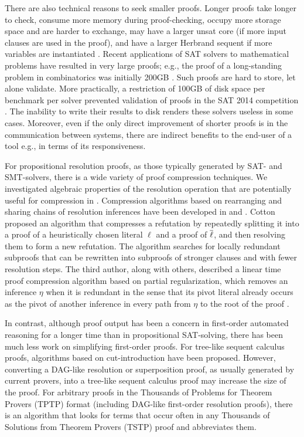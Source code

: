 There are also technical reasons to seek smaller proofs.
Longer proofs take longer to check, consume more memory during proof-checking, occupy more storage space and are harder to exchange, may have a larger unsat core (if more input clauses are used in the proof), and have a larger Herbrand sequent if more variables are instantiated \cite{B10,B16,ResolutionHerbrand,Reis}. Recent applications of SAT solvers to mathematical problems have resulted in very large proofs; e.g., the proof of a long-standing problem in combinatorics was initially 200GB \cite{heule2016solving}. Such proofs are hard to store, let alone validate. More practically, a restriction of 100GB of disk space per benchmark per solver prevented validation of proofs in the SAT 2014 competition \cite{clausal}. 
The inability to write their results to disk renders these solvers useless in some cases. Moreover, even if the only direct improvement of shorter proofs is in the communication between systems, there are indirect benefits to the end-user of a tool e.g., in terms of its responsiveness. 


For propositional resolution proofs, as those typically generated by SAT- and SMT-solvers, there is a wide variety of proof compression techniques. We investigated algebraic properties of the resolution operation that are potentially useful for compression in \cite{bwp10}.
Compression algorithms based on rearranging and sharing chains of resolution inferences have been
developed in \cite{Amjad07} and \cite{Sinz}.  Cotton \cite{CottonSplit} proposed an algorithm that
compresses a refutation by repeatedly splitting it into a proof of a heuristically chosen literal $\ell$
and a proof of $\overline{\ell}$, and then resolving them to form a new refutation.  The {\ReduceReconstruct} algorithm \cite{RedRec} searches for locally redundant
subproofs that can be rewritten into subproofs of stronger clauses and with fewer resolution steps.
The third author, along with others, described a linear time proof compression algorithm based on partial regularization, which removes an inference $\eta$ when it is redundant in the sense that its pivot literal already occurs as the pivot of another inference in every path from $\eta$ to the root of the proof \cite{RP08,LURPI}.

In contrast, although proof output has been a concern in first-order automated reasoning for a longer time than in propositional SAT-solving, there has been much less work on simplifying first-order proofs. For tree-like sequent calculus proofs, algorithms based on cut-introduction \cite{BrunoLPAR,Hetzl} have been proposed. However, converting a DAG-like resolution or superposition proof, as usually generated by current provers, into a tree-like sequent calculus proof may increase the size of the proof. For arbitrary proofs in the Thousands of Problems for Theorem Provers (TPTP) \cite{TPTP} format (including DAG-like first-order resolution proofs), there is an algorithm \cite{LPARCzech} that looks for terms that occur often in any Thousands of Solutions from Theorem Provers (TSTP) \cite{TPTP} proof and abbreviates them. 


